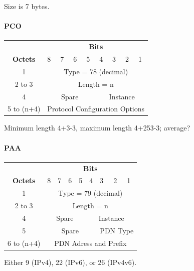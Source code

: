 Size is 7 bytes.

\paragraph{PCO}
\centering
\begin{tabular}{c|p{1cm}|p{1cm}|p{1cm}|p{1cm}|p{1cm}|p{1cm}|p{1cm}|p{1cm}|}
\multicolumn{1}{c}{} & \multicolumn{8}{c}{\textbf{Bits}} \\
\cline{2-9} \textbf{Octets} & 8 & 7 & 6 & 5 & 4 & 3 & 2 & 1 \\ 
\cline{2-9} 1 & \multicolumn{8}{c|}{Type = 78 (decimal)} \\ 
\cline{2-9} 2 to 3 & \multicolumn{8}{c|}{Length = n}  \\ 
\cline{2-9} 4 & \multicolumn{4}{c|}{Spare} & \multicolumn{4}{c|}{Instance} \\ 
\cline{2-9} 5 to (n+4) & \multicolumn{8}{c|}{Protocol Configuration Options} \\
\cline{2-9}
\end{tabular} 

Minimum length 4+3-3, maximum length 4+253-3; average?


\paragraph{PAA}
\centering

\begin{tabular}{c|p{1cm}|p{1cm}|p{1cm}|p{1cm}|p{1cm}|p{1cm}|p{1cm}|p{1cm}|}
\multicolumn{1}{c}{} & \multicolumn{8}{c}{\textbf{Bits}} \\
\cline{2-9} \textbf{Octets} & 8 & 7 & 6 & 5 & 4 & 3 & 2 & 1 \\ 
\cline{2-9} 1 & \multicolumn{8}{c|}{Type = 79 (decimal)} \\ 
\cline{2-9} 2 to 3 & \multicolumn{8}{c|}{Length = n}  \\ 
\cline{2-9} 4 & \multicolumn{4}{c|}{Spare} & \multicolumn{4}{c|}{Instance} \\ 
\cline{2-9} 5 & \multicolumn{5}{c|}{Spare} & \multicolumn{3}{c|}{PDN Type} \\
\cline{2-9} 6 to (n+4) & \multicolumn{8}{c|}{PDN Adress and Prefix} \\
\cline{2-9}
\end{tabular} 

Either 9 (IPv4), 22 (IPv6), or 26 (IPv4v6).


